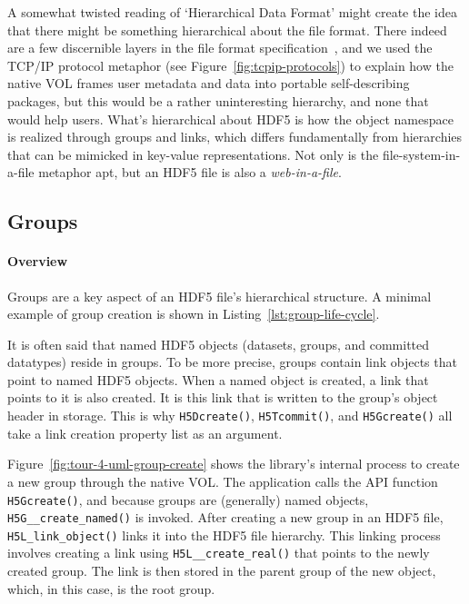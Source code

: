 

A somewhat twisted reading of `Hierarchical Data Format' might create the idea that there might be something hierarchical about the file format. There indeed are a few discernible layers in the file format specification~\cite{ffmt}, and we used the TCP/IP protocol metaphor (see Figure~\ref{fig:tcpip-protocols}) to explain how the native VOL frames user metadata and data into portable self-describing packages, but this would be a rather uninteresting hierarchy, and none that would help users. What's hierarchical about HDF5 is how the object namespace is realized through groups and links, which differs fundamentally from hierarchies that can be mimicked in key-value representations. Not only is the file-system-in-a-file metaphor apt, but an HDF5 file is also a \textit{web-in-a-file}.

\subsection{Groups}

\paragraph{Overview} Groups are a key aspect of an HDF5 file's hierarchical structure. A minimal example of group creation is shown in Listing~\ref{lst:group-life-cycle}. 

It is often said that named HDF5 objects (datasets, groups, and committed datatypes) reside in groups. To be more precise, groups contain link objects that point to named HDF5 objects. When a named object is created, a link that points to it is also created. It is this link that is written to the group's object header in storage. This is why \texttt{H5Dcreate()}, \texttt{H5Tcommit()}, and \texttt{H5Gcreate()} all take a link creation property list as an argument.

Figure~\ref{fig:tour-4-uml-group-create} shows the library's internal process to create a new group through the native VOL. The application calls the API function \texttt{H5Gcreate()}, and because groups are (generally) named objects, \texttt{H5G\_\_create\_named()} is invoked. After creating a new group in an HDF5 file, \texttt{H5L\_link\_object()} links it into the HDF5 file hierarchy. This linking process involves creating a link using \texttt{H5L\_\_create\_real()} that points to the newly created group. The link is then stored in the parent group of the new object, which, in this case, is the root group.


